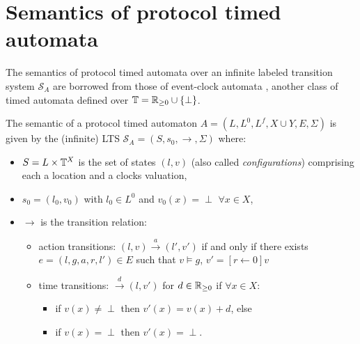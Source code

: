
\chapter{Semantics of protocol timed automata}
\label{chap:pta-semantics}


The semantics of protocol timed automata over an infinite labeled transition system $\mathcal{S}_A$ are borrowed from those of event-clock automata \cite{RALF94}, another class of timed automata defined over $\mathbb{T} = \mathbb{R}_{\geq 0} \cup \{ \perp \}$.

\begin{definition}
The semantic of a protocol timed automaton $A = (L, L^0, L^f, X \cup Y, E, \Sigma)$ is given by the (infinite) LTS $\mathcal{S}_A = (S, s_0, \rightarrow, \Sigma)$ where:
\begin{itemize}

    \item $S = L \times \mathbb{T}^X$ is the set of states $(l, v)$ (also called \emph{configurations}) comprising each a location and a clocks valuation,

    \item $s_0 = (l_0, v_0)$ with $l_0 \in L^0$ and $v_0(x) = \perp$ $\forall x \in X$,

    \item $\rightarrow$ is the transition relation:
    \begin{itemize}

        \item action transitions: $(l, v) \stackrel{a}{\longrightarrow} (l', v')$ if and only if there exists
        $e = (l, g, a, r, l') \in E$ such that $v \models g$, $v' = [r \leftarrow 0]v$ 

        \item time transitions: $\stackrel{d}{\longrightarrow} (l, v')$ for $d \in \mathbb{R}_{\geq 0}$ if $\forall x \in X$:
        \begin{itemize}
          \item if $v(x) \neq \perp$ then $v'(x) = v(x) + d$, else
          \item if $v(x) = \perp$ then $v'(x) = \perp$.
        \end{itemize}

    \end{itemize}

\end{itemize}
\end{definition}

